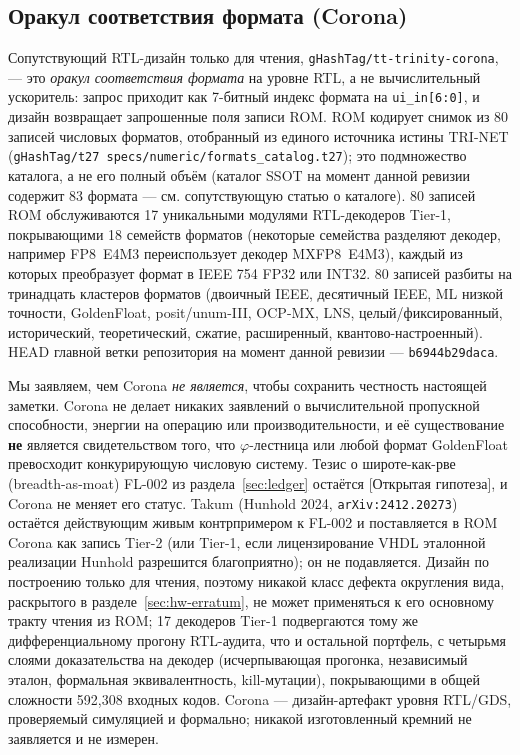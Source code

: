 \documentclass[11pt,a4paper]{article}
\theoremstyle{plain}
\begin{document}
\subsection{Оракул соответствия формата (Corona)}\label{sec:hw-corona}

Сопутствующий RTL-дизайн только для чтения, \texttt{gHashTag/tt-trinity-corona},
--- это \emph{оракул соответствия формата} на уровне RTL, а не вычислительный ускоритель: запрос
приходит как 7-битный индекс формата на \texttt{ui\_in[6:0]}, и дизайн возвращает
запрошенные поля записи ROM. ROM кодирует снимок из 80
записей числовых форматов, отобранный из единого источника истины TRI-NET
(\texttt{gHashTag/t27 specs/numeric/formats\_catalog.t27}); это подмножество
каталога, а не его полный объём (каталог SSOT на момент данной ревизии содержит
83 формата --- см. сопутствующую статью о каталоге). 80 записей ROM обслуживаются
17 уникальными модулями RTL-декодеров Tier-1, покрывающими 18 семейств форматов
(некоторые семейства разделяют декодер, например FP8~E4M3 переиспользует декодер
MXFP8~E4M3), каждый из которых преобразует формат в IEEE 754
FP32 или INT32. 80 записей разбиты на тринадцать кластеров форматов (двоичный
IEEE, десятичный IEEE, ML низкой точности, GoldenFloat, posit/unum-III, OCP-MX,
LNS, целый/фиксированный, исторический, теоретический, сжатие, расширенный,
квантово-настроенный). HEAD главной ветки
репозитория на момент данной ревизии --- \texttt{b6944b29daca}.

Мы заявляем, чем Corona \emph{не является}, чтобы сохранить честность настоящей
заметки. Corona не делает никаких заявлений о вычислительной пропускной
способности, энергии на операцию или производительности, и её существование
\textbf{не} является свидетельством того, что \(\varphi\)-лестница или любой формат GoldenFloat
превосходит конкурирующую числовую систему. Тезис о широте-как-рве
(breadth-as-moat) FL-002 из раздела~\ref{sec:ledger} остаётся [Открытая
гипотеза], и Corona не меняет его статус. Takum (Hunhold 2024,
\texttt{arXiv:2412.20273}) остаётся действующим живым контрпримером к FL-002 и
поставляется в ROM Corona как запись Tier-2 (или Tier-1, если лицензирование
VHDL эталонной реализации Hunhold разрешится благоприятно); он не подавляется.
Дизайн по построению только для чтения, поэтому никакой класс дефекта округления
вида, раскрытого в разделе~\ref{sec:hw-erratum}, не может применяться к его
основному тракту чтения из ROM; 17 декодеров Tier-1 подвергаются тому же
дифференциальному прогону RTL-аудита, что и остальной портфель, с четырьмя слоями
доказательства на декодер (исчерпывающая прогонка, независимый эталон, формальная
эквивалентность, kill-мутации), покрывающими в общей
сложности 592{,}308 входных кодов. Corona --- дизайн-артефакт уровня RTL/GDS,
проверяемый симуляцией и формально; никакой изготовленный кремний не заявляется и не измерен.
\end{document}
